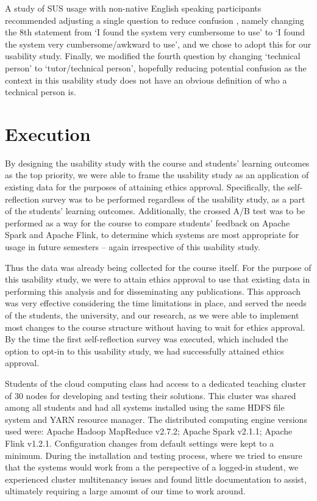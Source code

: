   A study of SUS usage with non-native English speaking participants recommended adjusting a single question to reduce confusion \cite{FINSTAD:SUS:2006}, namely changing the 8th statement from `I found the system very cumbersome to use' to `I found the system very cumbersome/awkward to use', and we chose to adopt this for our usability study. Finally, we modified the fourth question by changing `technical person' to `tutor/technical person', hopefully reducing potential confusion as the context in this usability study does not have an obvious definition of who a technical person is.


\section{Execution}
\label{EXECUTION}

  By designing the usability study with the course and students' learning outcomes as the top priority, we were able to frame the usability study as an application of existing data for the purposes of attaining ethics approval. Specifically, the self-reflection survey was to be performed regardless of the usability study, as a part of the students' learning outcomes. Additionally, the crossed A/B test was to be performed as a way for the course to compare students' feedback on Apache Spark and Apache Flink, to determine which systems are most appropriate for usage in future semesters -- again irrespective of this usability study.

  Thus the data was already being collected for the course itself. For the purpose of this usability study, we were to attain ethics approval to use that existing data in performing this analysis and for disseminating any publications. This approach was very effective considering the time limitations in place, and served the needs of the students, the university, and our research, as we were able to implement most changes to the course structure without having to wait for ethics approval. By the time the first self-reflection survey was executed, which included the option to opt-in to this usability study, we had successfully attained ethics approval.

  Students of the cloud computing class had access to a dedicated teaching cluster of 30 nodes for developing and testing their solutions. This cluster was shared among all students and had all systems installed using the same HDFS file system and YARN resource manager. The distributed computing engine versions used were: Apache Hadoop MapReduce v2.7.2; Apache Spark v2.1.1; Apache Flink v1.2.1. Configuration changes from default settings were kept to a minimum. During the installation and testing process, where we tried to ensure that the systems would work from a the perspective of a logged-in student, we experienced cluster multitenancy issues and found little documentation to assist, ultimately requiring a large amount of our time to work around.
  
